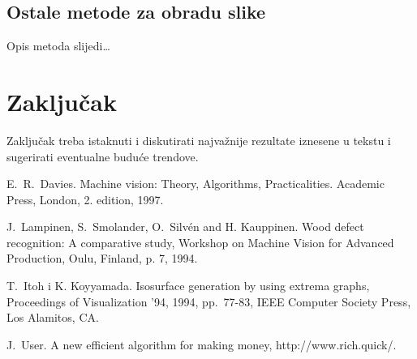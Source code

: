 \documentclass[a4paper,twocolumn]{article}
\begin{document}
 	
	
	\subsection{Ostale metode za obradu slike}
	
	Opis metoda slijedi\dots
	
	\section{Zaključak}
	Zaključak treba istaknuti i diskutirati najvažnije rezultate
	iznesene u tekstu i sugerirati eventualne buduće
	trendove.
	
	
	\begin{thebibliography}{25}
		
		E.~R.~Davies.
		Machine vision: Theory, Algorithms, Practicalities.
		Academic Press, London, 2. edition, 1997.
		
		J.~Lampinen, S.~Smolander, O.~Silv\'{e}n and H. Kauppinen.
		Wood defect recognition: A comparative study,
		Workshop on Machine Vision for Advanced Production, Oulu, Finland, p. 7, 1994.
		
		T.~Itoh i K. Koyyamada.
		Isosurface generation by using extrema graphs,
		Proceedings of Visualization '94, 1994, pp.~77-83, IEEE Computer Society Press, Los Alamitos, CA.
		
		J.~User.
		A new efficient algorithm for making money,
		http://www.rich.quick/.
		
	\end{thebibliography} 
	
\end{document}
